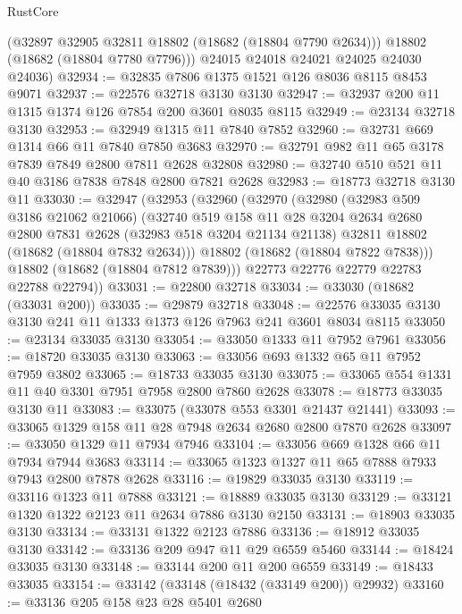 \begin{lexlean}{RustCore}
\begin{coremodule}
        (@32897 @32905 @32811 @18802 (@18682 (@18804 @7790 @2634)))
        @18802
        (@18682 (@18804 @7780 @7796)))
      @24015
      @24018
      @24021
      @24025
      @24030
      @24036)
@32934 := @32835 @7806 @1375 @1521 @126 @8036 @8115 @8453 @9071
@32937 := @22576 @32718 @3130 @3130
@32947 := @32937 @200 @11 @1315 @1374 @126 @7854 @200 @3601 @8035 @8115
@32949 := @23134 @32718 @3130
@32953 := @32949 @1315 @11 @7840 @7852
@32960 := @32731 @669 @1314 @66 @11 @7840 @7850 @3683
@32970 := @32791 @982 @11 @65 @3178 @7839 @7849 @2800 @7811 @2628 @32808
@32980 := @32740 @510 @521 @11 @40 @3186 @7838 @7848 @2800 @7821 @2628
@32983 := @18773 @32718 @3130 @11
@33030 := @32947
    (@32953
      (@32960
        (@32970
          (@32980
            (@32983 @509 @3186 @21062 @21066)
            (@32740
              @519
              @158
              @11
              @28
              @3204
              @2634
              @2680
              @2800
              @7831
              @2628
              (@32983 @518 @3204 @21134 @21138)
              @32811
              @18802
              (@18682 (@18804 @7832 @2634)))
            @18802
            (@18682 (@18804 @7822 @7838)))
          @18802
          (@18682 (@18804 @7812 @7839)))
        @22773
        @22776
        @22779
        @22783
        @22788
        @22794))
@33031 := @22800 @32718
@33034 := @33030 (@18682 (@33031 @200))
@33035 := @29879 @32718
@33048 := @22576 @33035 @3130 @3130 @241 @11 @1333 @1373 @126 @7963 @241 @3601 @8034 @8115
@33050 := @23134 @33035 @3130
@33054 := @33050 @1333 @11 @7952 @7961
@33056 := @18720 @33035 @3130
@33063 := @33056 @693 @1332 @65 @11 @7952 @7959 @3802
@33065 := @18733 @33035 @3130
@33075 := @33065 @554 @1331 @11 @40 @3301 @7951 @7958 @2800 @7860 @2628
@33078 := @18773 @33035 @3130 @11
@33083 := @33075 (@33078 @553 @3301 @21437 @21441)
@33093 := @33065 @1329 @158 @11 @28 @7948 @2634 @2680 @2800 @7870 @2628
@33097 := @33050 @1329 @11 @7934 @7946
@33104 := @33056 @669 @1328 @66 @11 @7934 @7944 @3683
@33114 := @33065 @1323 @1327 @11 @65 @7888 @7933 @7943 @2800 @7878 @2628
@33116 := @19829 @33035 @3130
@33119 := @33116 @1323 @11 @7888
@33121 := @18889 @33035 @3130
@33129 := @33121 @1320 @1322 @2123 @11 @2634 @7886 @3130 @2150
@33131 := @18903 @33035 @3130
@33134 := @33131 @1322 @2123 @7886
@33136 := @18912 @33035 @3130
@33142 := @33136 @209 @947 @11 @29 @6559 @5460
@33144 := @18424 @33035 @3130
@33148 := @33144 @200 @11 @200 @6559
@33149 := @18433 @33035
@33154 := @33142 (@33148 (@18432 (@33149 @200)) @29932)
@33160 := @33136 @205 @158 @23 @28 @5401 @2680

\end{coremodule}
\end{lexlean}
